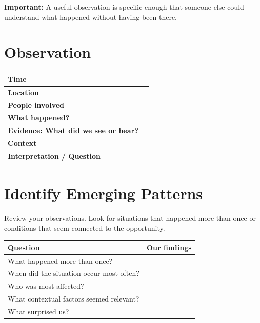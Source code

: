 \documentclass[12pt,a4paper]{article}
\begin{document}
	\vspace{0.2cm}
	
	\textbf{Important:} A useful observation is specific enough that someone else could understand what happened without having been there.
	
	\section*{Observation}
	
	\begin{center}
		\small
		\begin{tabular}{|L{0.22\textwidth}|L{0.61\textwidth}|}
			\hline
			\textbf{Time} & \rule{0pt}{0.45cm} \\
			\hline
			\textbf{Location} & \rule{0pt}{0.45cm} \\
			\hline
			\textbf{People involved} & \rule{0pt}{0.45cm} \\
			\hline
			\textbf{What happened?} & \rule{0pt}{0.75cm} \\
			\hline
			\textbf{Evidence: What did we see or hear?} & \rule{0pt}{0.75cm} \\
			\hline
			\textbf{Context} & \rule{0pt}{0.65cm} \\
			\hline
			\textbf{Interpretation / Question} & \rule{0pt}{0.65cm} \\
			\hline
		\end{tabular}
	\end{center}
	
	\section*{Identify Emerging Patterns}
	
	Review your observations. Look for situations that happened more than once or conditions that seem connected to the opportunity.
	
	\begin{center}
		\small
		\begin{tabular}{|m{}|m{}|}
			\hline
			\textbf{Question} & \textbf{Our findings} \\
			\hline
			What happened more than once? & \rule{0pt}{2.3cm} \\
			\hline
			When did the situation occur most often? & \rule{0pt}{2.3cm} \\
			\hline
			Who was most affected? & \rule{0pt}{2.3cm} \\
			\hline
			What contextual factors seemed relevant? & \rule{0pt}{2.5cm} \\
			\hline
			What surprised us? & \rule{0pt}{2.3cm} \\
			\hline
		\end{tabular}
	\end{center}
\end{document}
